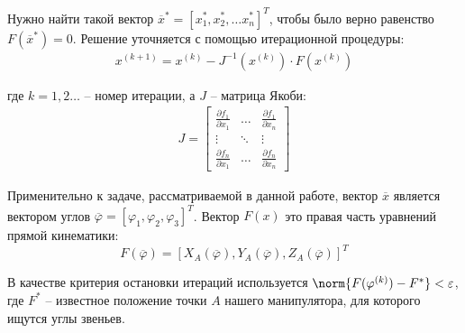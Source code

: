 Нужно найти такой вектор $ \overline{x}^*=[x_1^*, x_2^*, \dots x_n^*]^T $, чтобы было верно равенство $ F(\overline{x}^*) = 0 $. Решение уточняется с помощью итерационной процедуры:
\begin{align*} %
    x^{(k+1)}=x^{(k)}-J^{-1}(x^{(k)}) \cdot F(x^{(k)})
\end{align*} %

\noindent где $ k=1,2\dots $ -- номер итерации, а $ J $ -- матрица Якоби:
\begin{align*}
    J = \begin{bmatrix}
        \frac{\partial f_1}{\partial x_1} & \dots & \frac{\partial f_1}{\partial x_n} \\
        \vdots & \ddots & \vdots \\
        \frac{\partial f_n}{\partial x_1} & \dots & \frac{\partial f_n}{\partial x_n}
    \end{bmatrix}
\end{align*}

Применительно к задаче, рассматриваемой в данной работе, вектор $ \overline{x} $ является  вектором углов $ \overline{\varphi} = [ \varphi_1, \varphi_2, \varphi_3 ]^T $. Вектор $ F(x) $ это правая часть уравнений прямой кинематики:
\begin{equation*}
    F(\overline{\varphi}) = [ X_A(\overline{\varphi}), Y_A(\overline{\varphi}), Z_A(\overline{\varphi}) ]^T
\end{equation*}

\noindent В качестве критерия остановки итераций используется $ \norm{F(\varphi^{(k)}) - F^* } < \varepsilon $, где $ F^* $ -- известное положение точки $ A $ нашего манипулятора, для которого ищутся углы звеньев. %

